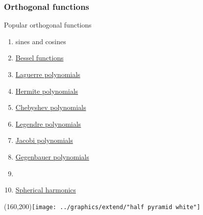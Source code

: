 \documentclass[handout]{beamer}
\begin{document}
\begin{frame}      %
\frametitle{Orthogonal functions}
  Popular orthogonal functions
  \begin{enumerate}
    \item sines and cosines
    \item \href{http://mathworld.wolfram.com/BesselFunction.html}{Bessel functions}
    \item \href{http://mathworld.wolfram.com/LaguerrePolynomial.html}{Laguerre polynomials}
    \item \href{http://mathworld.wolfram.com/HermitePolynomial.html}{Hermite polynomials}
    \item \href{http://mathworld.wolfram.com/ChebyshevPolynomialoftheFirstKind.html}{Chebyshev polynomials}
    \item \href{http://mathworld.wolfram.com/LegendrePolynomial.html}{Legendre polynomials}
    \item \href{http://mathworld.wolfram.com/JacobiPolynomial.html}{Jacobi polynomials}
    \item \href{http://mathworld.wolfram.com/GegenbauerPolynomial.html}{Gegenbauer polynomials}
    \item \href{http://mathworld.wolfram.com/ZernikePolynomial.html}{}
    \item \href{http://mathworld.wolfram.com/SphericalHarmonic.html}{Spherical harmonics}
  \end{enumerate}
    \Put(160,200){\texttt{[image: ../graphics/extend/"half pyramid white"]}}
\end{frame}
\end{document}
